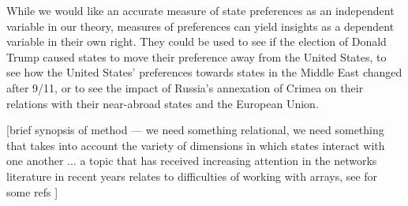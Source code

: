 While we would like an accurate measure of state preferences as an independent variable in our theory, measures of preferences can yield insights as a dependent variable in their own right. They could be used to see if the election of Donald Trump caused states to move their preference away from the United States, to see how the United States' preferences towards states in the Middle East changed after 9/11, or to see the impact of Russia's annexation of Crimea on their relations with their near-abroad states and the European Union.

[brief synopsis of method --- we need something relational, we need something that takes into account the variety of dimensions in which states interact with one another ... a topic that has received increasing attention in the networks literature in recent years relates to difficulties of working with arrays, see \citep{minhas:etal:2016} for some refs ]
